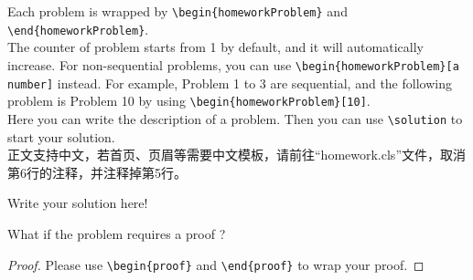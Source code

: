 \documentclass[UTF8]{homework}
\begin{document}
\maketitle
\if{}
    \pagebreak
\fi


%
%
\begin{homeworkProblem}
    Each problem is wrapped by \verb|\begin{homeworkProblem}| and \verb|\end{homeworkProblem}|.\\

    The counter of problem starts from 1 by default, and it will automatically increase.
    For non-sequential problems, you can use \verb|\begin{homeworkProblem}[a number]| instead.
    For example, Problem 1 to 3 are sequential, and the following problem is Problem 10 by using \verb|\begin{homeworkProblem}[10]|.\\
    
    Here you can write the description of a problem.
    Then you can use \verb|\solution| to start your solution.\\

    正文支持中文，若首页、页眉等需要中文模板，请前往“homework.cls”文件，取消第6行的注释，并注释掉第5行。
    
    \solution

    Write your solution here!

\end{homeworkProblem}


%
%
\begin{homeworkProblem}
    What if the problem requires a proof ? 

    \begin{proof}
        Please use \verb|\begin{proof}| and \verb|\end{proof}| to wrap your proof.
    \end{proof}

\end{homeworkProblem}
\end{document}
